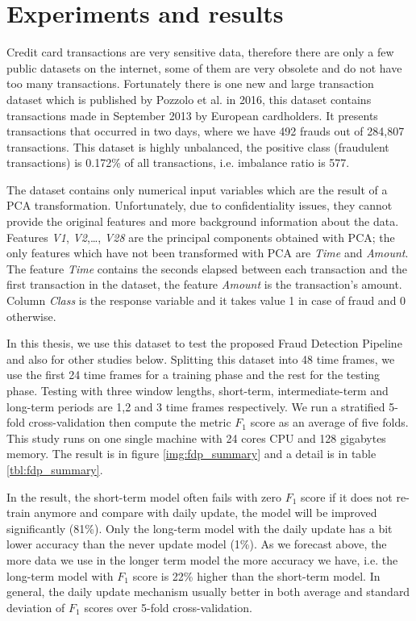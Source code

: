 \section{Experiments and results}

Credit card transactions are very sensitive data, therefore there are only a few public datasets on the internet, some of them are very obsolete and do not have too many transactions. Fortunately there is one new and large transaction dataset which is published by Pozzolo et al. \citep{dal2015calibrating} in 2016, this dataset contains transactions made in September 2013 by European cardholders. It presents transactions that occurred in two days, where we have 492 frauds out of 284,807 transactions. This dataset is highly unbalanced, the positive class (fraudulent transactions) is 0.172\% of all transactions, i.e. imbalance ratio is 577.

The dataset contains only numerical input variables which are the result of a PCA transformation. Unfortunately, due to confidentiality issues, they cannot provide the original features and more background information about the data. Features \textit{V1}, \textit{V2},\dots, \textit{V28} are the principal components obtained with PCA; the only features which have not been transformed with PCA are \textit{Time} and \textit{Amount}. The feature \textit{Time} contains the seconds elapsed between each transaction and the first transaction in the dataset, the feature \textit{Amount} is the transaction's amount. Column \textit{Class} is the response variable and it takes value 1 in case of fraud and 0 otherwise.

In this thesis, we use this dataset to test the proposed Fraud Detection Pipeline and also for other studies below. Splitting this dataset into 48 time frames, we use the first 24 time frames for a training phase and the rest for the testing phase. Testing with three window lengths, short-term, intermediate-term and long-term periods are 1,2 and 3 time frames respectively. We run a stratified 5-fold cross-validation then compute the metric $F_1$ score as an average of five folds. This study runs on one single machine with 24 cores CPU and 128 gigabytes memory. The result is in figure \ref{img:fdp_summary} and a detail is in table \ref{tbl:fdp_summary}. 

In the result, the short-term model often fails with zero $F_1$ score if it does not re-train anymore and compare with daily update, the model will be improved significantly (81\%). Only the long-term model with the daily update has a bit lower accuracy than the never update model (1\%). As we forecast above, the more data we use in the longer term model the more accuracy we have, i.e. the long-term model with $F_1$ score is 22\% higher than the short-term model. In general, the daily update mechanism usually better in both average and standard deviation of $F_1$ scores over 5-fold cross-validation.


